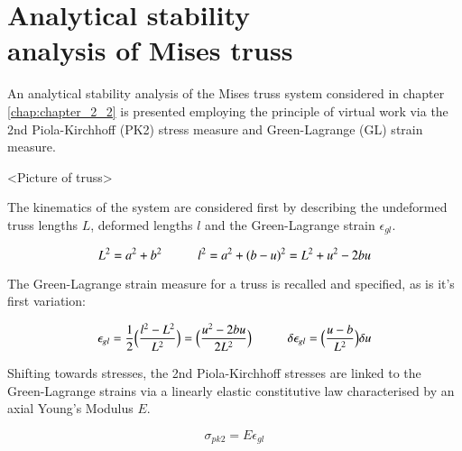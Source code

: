
\chapter[Analytical stability analysis of Mises truss]{Analytical stability\\ analysis of Mises truss}
\label{app:Analytical stability analysis of Mises truss}

An analytical stability analysis of the Mises truss system considered in chapter \ref{chap:chapter_2_2} is presented employing the principle of virtual work via the 2nd Piola-Kirchhoff (PK2) stress measure and Green-Lagrange (GL) strain measure.

<Picture of truss>

The kinematics of the system are considered first by describing the undeformed truss lengths $L$, deformed lengths $l$ and the Green-Lagrange strain $\epsilon_{gl}$.

\begin{equation} 
L^2 = a^2 + b^2
\hspace{10mm}
l^2 = a^2 + (b-u)^2 = L^2 + u^2 - 2bu
\label{eqapp0_1}
\end{equation}

The Green-Lagrange strain measure for a truss is recalled and specified, as is it's first variation:

\begin{equation} 
\epsilon_{gl} = \frac{1}{2}
\Big(\frac{l^2-L^2}{L^2}\Big)
=
\Big(\frac{u^2 - 2bu}{2L^2}\Big)
\hspace{10mm}
\delta\epsilon_{gl} = 
\Big(\frac{u-b}{L^2}\Big)
\delta u
\label{eqapp0_2}
\end{equation}

Shifting towards stresses, the 2nd Piola-Kirchhoff stresses are linked to the Green-Lagrange strains via a linearly elastic constitutive law characterised by an axial Young's Modulus $E$.

\begin{equation} 
\sigma_{pk2} = E \epsilon_{gl}
\label{eqapp0_3}
\end{equation}

